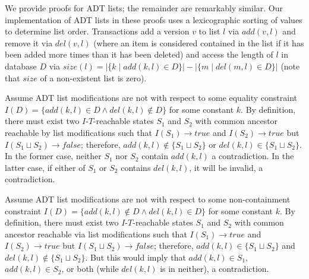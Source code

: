 We provide proofs for ADT lists; the remainder are remarkably similar. Our implementation of ADT lists in these proofs uses a lexicographic sorting of values to determine list order. Transactions add a version $v$ to list $l$ via $add(v,l)$ and remove it via $del(v,l)$ (where an item is considered contained in the list if it has been added more times than it has been deleted) and access the length of $l$ in database $D$ via $size(l) = |\{k \mid add(k, l) \in D\}|- |\{m \mid del(m, l) \in D\}|$ (note that $size$ of a non-existent list is zero).

\begin{claim}
  Assume ADT list modifications are not \iconfluent with respect to some equality constraint $I(D)=\{add(k, l) \in D \wedge del(k, l) \notin D \}$ for some constant $k$. By definition, there must exist two $I$-$T$-reachable states $S_1$ and $S_2$ with common ancestor reachable by list modifications such that $I(S_1) \rightarrow true$ and $I(S_2) \rightarrow true$ but $I(S_1 \sqcup S_2) \rightarrow false$; therefore, $add(k, l) \notin \{S_1 \sqcup S_2\}$ or $del(k, l) \in \{S_1 \sqcup S_2\}$. In the former case, neither $S_1$ nor $S_2$ contain $add(k,l)$ a contradiction. In the latter case, if either of $S_1$ or $S_2$ contains $del(k,l)$, it will be invalid, a contradiction.\end{claim}

\begin{claim}
Assume ADT list modifications are not \iconfluent with respect to some non-containment constraint $I(D)=\{add(k, l) \notin D \wedge del(k, l) \in D\}$ for some constant $k$. By definition, there must exist two $I$-$T$-reachable states $S_1$ and $S_2$ with common ancestor reachable via list modifications such that $I(S_1) \rightarrow true$ and $I(S_2) \rightarrow true$ but $I(S_1 \sqcup S_2) \rightarrow false$; therefore, $add(k, l) \in \{S_1 \sqcup S_2\}$ and $del(k,l) \notin \{S_1 \sqcup S_2\}$. But this would imply that $add(k, l) \in S_1$, $add(k, l) \in S_2$, or both (while $del(k,l)$ is in neither), a contradiction.\end{claim}

